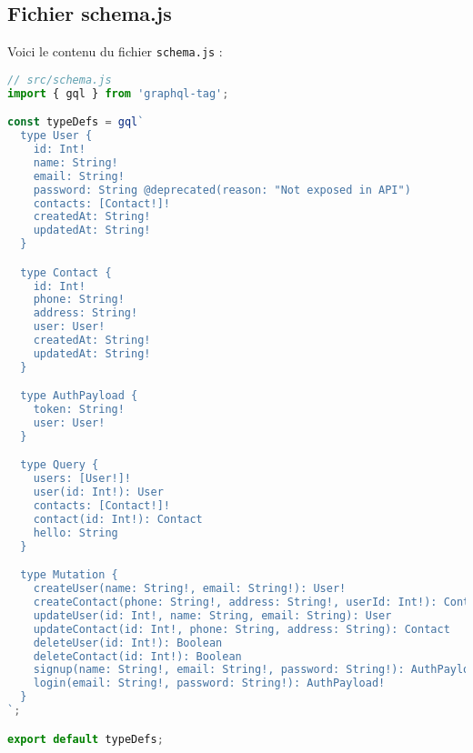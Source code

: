 \documentclass{article}
\begin{document}
\subsection{Fichier schema.js}
Voici le contenu du fichier \texttt{schema.js} :
\begin{lstlisting}[language=JavaScript]
// src/schema.js
import { gql } from 'graphql-tag';

const typeDefs = gql`
  type User {
    id: Int!
    name: String!
    email: String!
    password: String @deprecated(reason: "Not exposed in API")
    contacts: [Contact!]!
    createdAt: String!
    updatedAt: String!
  }

  type Contact {
    id: Int!
    phone: String!
    address: String!
    user: User!
    createdAt: String!
    updatedAt: String!
  }

  type AuthPayload {
    token: String!
    user: User!
  }

  type Query {
    users: [User!]!
    user(id: Int!): User
    contacts: [Contact!]!
    contact(id: Int!): Contact
    hello: String
  }

  type Mutation {
    createUser(name: String!, email: String!): User!
    createContact(phone: String!, address: String!, userId: Int!): Contact!
    updateUser(id: Int!, name: String, email: String): User
    updateContact(id: Int!, phone: String, address: String): Contact
    deleteUser(id: Int!): Boolean
    deleteContact(id: Int!): Boolean
    signup(name: String!, email: String!, password: String!): AuthPayload!
    login(email: String!, password: String!): AuthPayload!
  }
`;

export default typeDefs;
\end{lstlisting}
\end{document}
